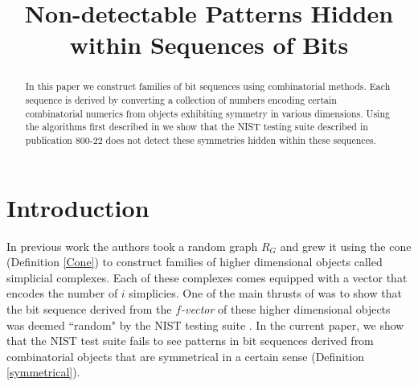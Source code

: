 \documentclass[oneside,12pt]{amsart}
\theoremstyle{definition}
\numberwithin{equation}{section}
\begin{document}
\title{Non-detectable Patterns Hidden within Sequences of Bits}

%
%
%


\begin{abstract}
In this paper we construct families of bit sequences using combinatorial methods.  Each sequence is derived by converting a collection of numbers encoding certain combinatorial numerics from objects exhibiting symmetry in various dimensions.  Using the algorithms first described in \cite{ALDH} we show that the NIST testing suite described in publication 800-22 does not detect these symmetries hidden within these sequences.

\end{abstract}

\maketitle

\section{Introduction}

In previous work \cite{ALDH} the authors took a random graph $R_G$ and grew it using the cone (Definition \ref{Cone}) to construct families of higher dimensional objects called simplicial complexes.  Each of these complexes comes equipped with a vector that encodes the number of $i$ simplicies.  One of the main thrusts of \cite{ALDH} was to show that the bit sequence derived from the \textit{$f$-vector} of these higher dimensional objects was deemed ``random" by the NIST testing suite \cite{NIST}.  In the current paper, we show that the NIST test suite fails to see patterns in bit sequences derived from combinatorial objects that are symmetrical in a certain sense (Definition \ref{symmetrical}).
\end{document}
